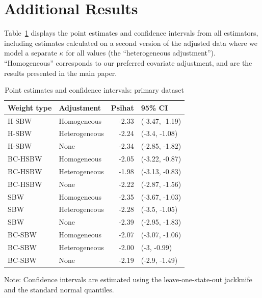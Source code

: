 \section{Additional Results}
\label{ssec:allresults}

Table~\ref{tab:confintmain} displays the point estimates and confidence intervals from all estimators, including estimates calculated on a second version of the adjusted data where we model a separate $\kappa$ for all values (the ``heterogeneous adjustment''). ``Homogeneous'' corresponds to our preferred covariate adjustment, and are the results presented in the main paper.

\begin{table}[h!]
\centering
\begin{threeparttable}
\caption{Point estimates and confidence intervals: primary dataset}
\label{tab:confintmain}
\begin{tabular}{llrl}
  \hline
Weight type & Adjustment & Psihat & 95\% CI \\ 
  \hline
H-SBW & Homogeneous & -2.33 & (-3.47, -1.19) \\ 
  H-SBW & Heterogeneous & -2.24 & (-3.4, -1.08) \\ 
  H-SBW & None & -2.34 & (-2.85, -1.82) \\ 
  BC-HSBW & Homogeneous & -2.05 & (-3.22, -0.87) \\ 
  BC-HSBW & Heterogeneous & -1.98 & (-3.13, -0.83) \\ 
  BC-HSBW & None & -2.22 & (-2.87, -1.56) \\ 
  SBW & Homogeneous & -2.35 & (-3.67, -1.03) \\ 
  SBW & Heterogeneous & -2.28 & (-3.5, -1.05) \\ 
  SBW & None & -2.39 & (-2.95, -1.83) \\ 
  BC-SBW & Homogeneous & -2.07 & (-3.07, -1.06) \\ 
  BC-SBW & Heterogeneous & -2.00 & (-3, -0.99) \\ 
  BC-SBW & None & -2.19 & (-2.9, -1.49) \\ 
   \hline
\end{tabular}
    \begin{tablenotes}
      \item[] Note: Confidence intervals are estimated using the leave-one-state-out jackknife and the standard normal quantiles.
    \end{tablenotes}
\end{threeparttable}
\end{table}


